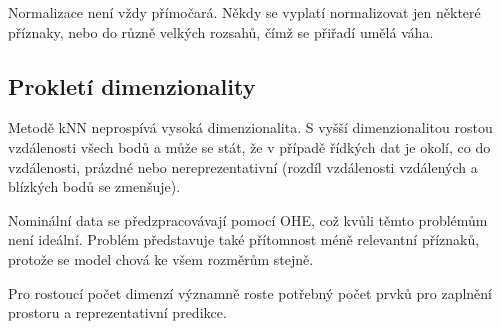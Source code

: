 \documentclass[../main.tex]{subfiles}
\begin{document}
Normalizace není vždy přímočará. Někdy se vyplatí normalizovat jen některé příznaky, nebo do různě velkých rozsahů, čímž se přiřadí umělá váha.

\subsection{Prokletí dimenzionality}

Metodě kNN neprospívá vysoká dimenzionalita. S vyšší dimenzionalitou rostou vzdálenosti všech bodů a může se stát, že v případě řídkých dat je okolí, co do vzdálenosti, prázdné nebo nereprezentativní (rozdíl vzdálenosti vzdálených a blízkých bodů se zmenšuje).

Nominální data se předzpracovávají pomocí OHE, což kvůli těmto problémům není ideální. Problém představuje také přítomnost méně relevantní příznaků, protože se model chová ke všem rozměrům stejně.

Pro rostoucí počet dimenzí významně roste potřebný počet prvků pro zaplnění prostoru a reprezentativní predikce.
\end{document}
